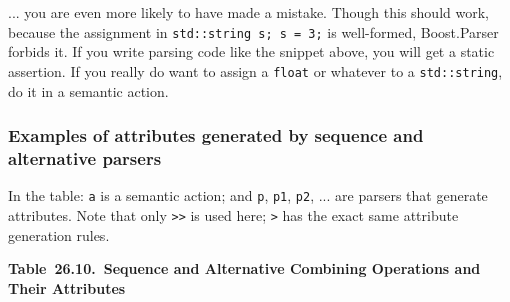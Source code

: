 ... you are even more likely to have made a mistake. Though this should work, because the assignment in \texttt{std::string s; s = 3;} is well-formed, Boost.Parser forbids it. If you write parsing code like the snippet above, you will get a static assertion. If you really do want to assign a \texttt{float} or whatever to a \texttt{std::string}, do it in a semantic action.

\subsubsection{Examples of attributes generated by sequence and alternative parsers}

In the table: \texttt{a} is a semantic action; and \texttt{p}, \texttt{p1}, \texttt{p2}, ... are parsers that generate attributes. Note that only \texttt{>>} is used here; \texttt{>} has the exact same attribute generation rules.

\textbf{Table~26.10.~Sequence and Alternative Combining Operations and Their Attributes}

